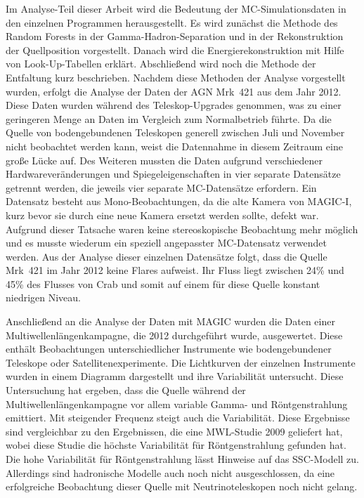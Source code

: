 Im Analyse-Teil dieser Arbeit wird die Bedeutung der MC-Simulationsdaten in den einzelnen Programmen herausgestellt.
Es wird zunächst die Methode des Random Forests in der Gamma-Hadron-Separation und in der Rekonstruktion der Quellposition vorgestellt.
Danach wird die Energierekonstruktion mit Hilfe von Look-Up-Tabellen erklärt.
Abschließend wird noch die Methode der Entfaltung kurz beschrieben.
Nachdem diese Methoden der Analyse vorgestellt wurden, erfolgt die Analyse der Daten der AGN Mrk~421 aus dem Jahr 2012.
Diese Daten wurden während des Teleskop-Upgrades genommen, was zu einer geringeren Menge an Daten im Vergleich zum Normalbetrieb führte.
Da die Quelle von bodengebundenen Teleskopen generell zwischen Juli und November nicht beobachtet werden kann, weist die Datennahme in diesem Zeitraum eine große Lücke auf. 
Des Weiteren mussten die Daten aufgrund verschiedener Hardwareveränderungen und Spiegeleigenschaften in vier separate Datensätze getrennt werden, die jeweils vier separate MC-Datensätze erfordern.
Ein Datensatz besteht aus Mono-Beobachtungen, da die alte Kamera von MAGIC-I, kurz bevor sie durch eine neue Kamera ersetzt werden sollte, defekt war.
Aufgrund dieser Tatsache waren keine stereoskopische Beobachtung mehr möglich und es musste wiederum ein speziell angepasster MC-Datensatz verwendet werden.
Aus der Analyse dieser einzelnen Datensätze folgt, dass die Quelle Mrk~421 im Jahr 2012 keine Flares aufweist.
Ihr Fluss liegt zwischen 24\% und 45\% des Flusses von Crab und somit auf einem für diese Quelle konstant niedrigen Niveau.

Anschließend an die Analyse der Daten mit MAGIC wurden die Daten einer Multiwellenlängenkampagne, die 2012 durchgeführt wurde, ausgewertet.
Diese enthält Beobachtungen unterschiedlicher Instrumente wie bodengebundener Teleskope oder Satellitenexperimente.
Die Lichtkurven der einzelnen Instrumente wurden in einem Diagramm dargestellt und ihre Variabilität untersucht.
Diese Untersuchung hat ergeben, dass die Quelle während der Multiwellenlängenkampagne vor allem variable Gamma- und Röntgenstrahlung emittiert.
Mit steigender Frequenz steigt auch die Variabilität.
Diese Ergebnisse sind vergleichbar zu den Ergebnissen, die eine MWL-Studie 2009 geliefert hat, wobei diese Studie die höchste Variabilität für Röntgenstrahlung gefunden hat.
Die hohe Variabilität für Röntgenstrahlung lässt Hinweise auf das SSC-Modell zu.
Allerdings sind hadronische Modelle auch noch nicht ausgeschlossen, da eine erfolgreiche Beobachtung dieser Quelle mit Neutrinoteleskopen noch nicht gelang.

